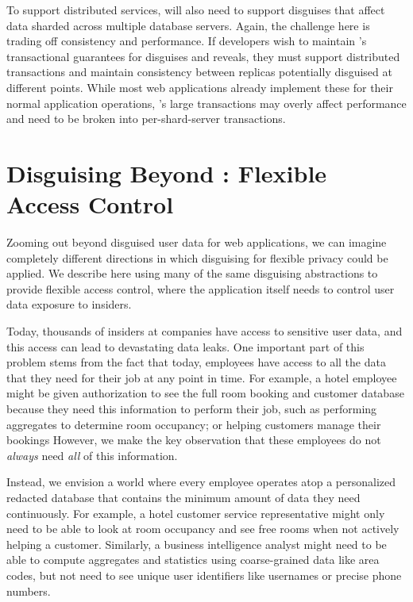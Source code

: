 %
To support distributed services, \sys will also need to support disguises that
affect data sharded across multiple database servers.
%
Again, the challenge here is trading off consistency and performance.  If
developers wish to maintain \sys's transactional guarantees for disguises and
reveals, they must support distributed transactions and maintain consistency
between replicas potentially disguised at different points. While most web
applications already implement these for their normal application operations,
\sys's large transactions may overly affect performance and \eg need to be
broken into per-shard-server transactions.
%

\section{Disguising Beyond \sys: Flexible Access Control}

Zooming out beyond disguised user data for web applications, we can imagine
completely different directions in which disguising for flexible privacy could
be applied. We describe here using many of the same disguising abstractions to
provide flexible access control, where the application itself needs to control
user data exposure to insiders.

Today, thousands of insiders at companies have access to sensitive user data,
and this access can lead to devastating data leaks.
%
One important part of this problem stems from the fact that today, employees
have access to all the data that they need for their job at any point in time.
For example, a hotel employee might be given authorization to see the full room
booking and customer database because they need this information to perform
their job, such as performing aggregates to determine room occupancy; or helping
customers manage their bookings
%
However, we make the key observation that these employees do not \emph{always} need
\emph{all} of this information.

Instead, we envision a world where every employee operates atop a personalized
redacted database that contains the minimum amount of data they need
continuously. For example, a hotel customer service representative might only
need to be able to look at room occupancy and see free rooms when not actively
helping a customer.
%
Similarly, a business intelligence analyst might need to be able to compute
aggregates and statistics using coarse-grained data like area codes, but not
need to see unique user identifiers like usernames or precise phone numbers.
%

